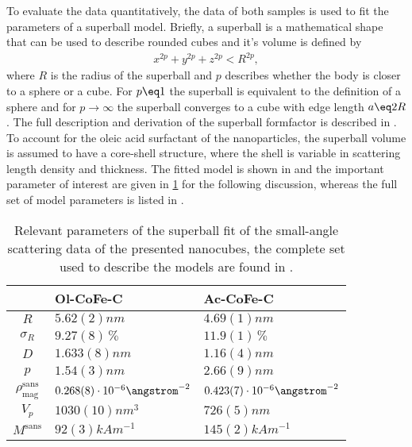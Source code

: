 \documentclass[\main/dresen_thesis.tex]{subfiles}
\begin{document}
    To evaluate the data quantitatively, the data of both samples is used to fit the parameters of a superball model.
    Briefly, a superball is a mathematical shape that can be used to describe rounded cubes and it's volume is defined by
    \begin{align}
      x^{2p} + y^{2p} + z^{2p} < R^{2p},
    \end{align}
    where $R$ is the radius of the superball and $p$ describes whether the body is closer to a sphere or a cube.
    For $p\eq 1$ the superball is equivalent to the definition of a sphere and for $p \rightarrow \infty$ the superball converges to a cube with edge length $a \eq 2R$.
    The full description and derivation of the superball formfactor is described in .
    To account for the oleic acid surfactant of the nanoparticles, the superball volume is assumed to have a core-shell structure, where the shell is variable in scattering length density and thickness.
    The fitted model is shown in  and the important parameter of interest are given in \ref{tab:monolayers:nanoparticle:sas} for the following discussion, whereas the full set of model parameters is listed in .
    \begin{table}[ht]
      \centering
      \caption{\label{tab:monolayers:nanoparticle:sas}Relevant parameters of the superball fit of the small-angle scattering data of the presented nanocubes, the complete set used to describe the models are found in .}
      \begin{tabular}{ c | l | l }
          & Ol-CoFe-C & Ac-CoFe-C \\
        \hline
        $R$
          & $5.62(2) \unit{nm}$
          & $4.69(1) \unit{nm}$\\
        $\sigma_R$
          & $9.27(8) \,\%$
          & $11.9(1) \,\%$\\
        $D$
          & $1.633(8) \unit{nm}$
          & $1.16(4) \unit{nm}$\\
        $p$
          & $1.54(3) \unit{nm}$
          & $2.66(9) \unit{nm}$\\
        $\rho_\mathrm{mag}^\mathrm{sans}$
          & $0.268(8) \cdot 10^{-6} \angstrom^{-2}$
          & $0.423(7) \cdot 10^{-6} \angstrom^{-2}$\\
        \hline
        $V_p$
          & $1030(10) \unit{nm^3}$
          & $726(5) \unit{nm}$\\
        $M^\mathrm{sans}$
          & $92(3) \unit{kAm^{-1}}$
          & $145(2) \unit{kAm^{-1}}$\\
        \hline
      \end{tabular}
    \end{table}
\end{document}
